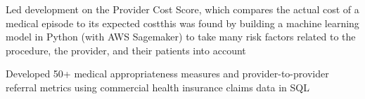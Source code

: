\documentclass[a4paper]{deedy-resume-openfont} %
\begin{document}
\begin{minipage}[t]{0.66\textwidth}
\begin{tightitemize}
	\item Led development on the Provider Cost Score, which compares the actual cost of a medical episode to its expected cost\textemdash this was found by building a machine learning model in Python (with AWS Sagemaker) to take many risk factors related to the procedure, the provider, and their patients into account %
	\item Developed 50+ medical appropriateness measures and provider-to-provider referral metrics using commercial health insurance claims data in SQL %
\end{tightitemize}


\end{minipage}
\end{document}
